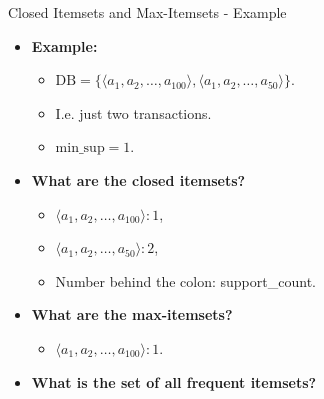 \begin{frame}{Closed Itemsets and Max-Itemsets - Example}
	\begin{itemize}
		\item \textbf{Example:}
		      \begin{itemize}
			      \item $\text{DB} = \{\langle a_1,a_2, \ldots, a_{100} \rangle,
				            \langle a_1, a_2, \ldots, a_{50} \rangle \}$.
			      \item I.e. just two transactions.
			      \item $\text{min\_sup} = 1$.
		      \end{itemize}
		\item \textbf{What are the closed itemsets?}
		      \begin{itemize}
			      \item $\langle a_1,a_2, \ldots, a_{100} \rangle : 1$,
			      \item $\langle a_1,a_2, \ldots, a_{50} \rangle : 2$,
			      \item Number behind the colon: support\_count.
		      \end{itemize}
		\item \textbf{What are the max-itemsets?}
		      \begin{itemize}
			      \item $\langle a_1,a_2, \ldots, a_{100} \rangle : 1$.
		      \end{itemize}
		\item \textbf{What is the set of all frequent itemsets?}
	\end{itemize}
\end{frame}
